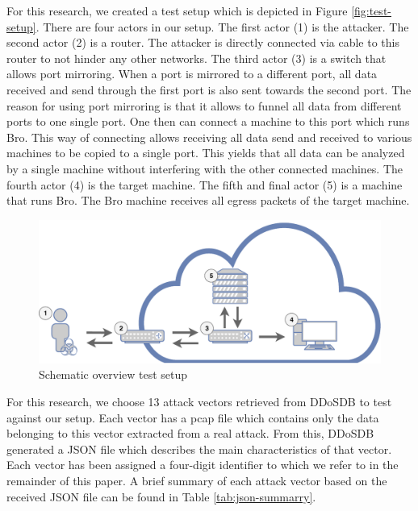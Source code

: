 For this research, we created a test setup which is depicted in Figure \ref{fig:test-setup}. There are four actors in our setup. The first actor (1) is the attacker. The second actor (2) is a router. The attacker is directly connected via cable to this router to not hinder any other networks. The third actor (3) is a switch that allows port mirroring. When a port is mirrored to a different port, all data received and send through the first port is also sent towards the second port. The reason for using port mirroring is that it allows to funnel all data from different ports to one single port. One then can connect a machine to this port which runs Bro. This way of connecting allows receiving all data send and received to various machines to be copied to a single port. This yields that all data can be analyzed by a single machine without interfering with the other connected machines. The fourth actor (4) is the target machine. The fifth and final actor (5) is a machine that runs Bro. The Bro machine receives all egress packets of the target machine. 


\begin{figure}[H]
\centering
\includegraphics[width=\textwidth]{./images/test-setup.pdf}
\caption{Schematic overview test setup}
\end{figure}\label{fig:test-setup}

For this research, we choose 13 attack vectors retrieved from DDoSDB to test against our setup. Each vector has a pcap file which contains only the data belonging to this vector extracted from a real attack. From this, DDoSDB generated a JSON file which describes the main characteristics of that vector. Each vector has been assigned a four-digit identifier to which we refer to in the remainder of this paper. A brief summary of each attack vector based on the received JSON file can be found in Table \ref{tab:json-summarry}.  



